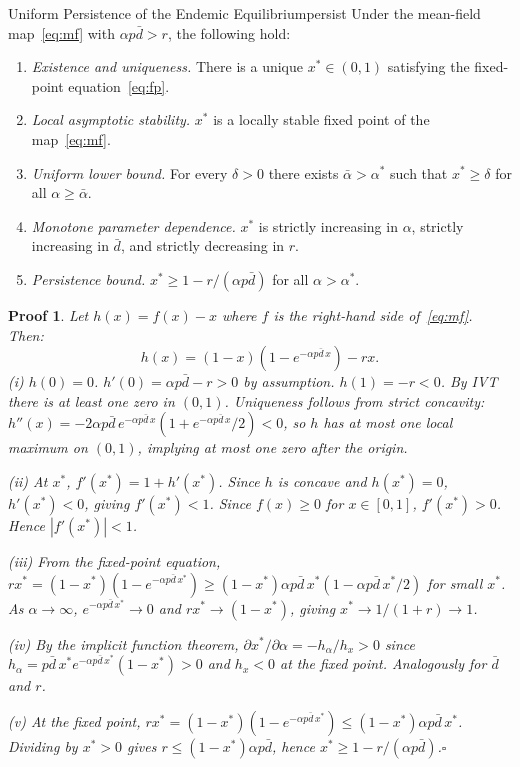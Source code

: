 \documentclass[10pt,twocolumn]{article}
\theoremstyle{myproof}
\newtheorem*{proof*}{Proof}
\newcommand{\xst}{x^*}
\begin{document}
\begin{theorem}{Uniform Persistence of the Endemic Equilibrium}{persist}
Under the mean-field map~\eqref{eq:mf} with $\alpha p\bar{d}>r$, the following hold:
\begin{enumerate}
  \item[\normalfont(i)] \emph{Existence and uniqueness.} There is a unique $\xst\in(0,1)$
       satisfying the fixed-point equation~\eqref{eq:fp}.
  \item[\normalfont(ii)] \emph{Local asymptotic stability.} $\xst$ is a locally stable fixed
       point of the map~\eqref{eq:mf}.
  \item[\normalfont(iii)] \emph{Uniform lower bound.} For every $\delta>0$ there exists
       $\bar\alpha>\alpha^*$ such that $\xst\geq\delta$ for all $\alpha\geq\bar\alpha$.
  \item[\normalfont(iv)] \emph{Monotone parameter dependence.} $\xst$ is strictly increasing
       in $\alpha$, strictly increasing in $\bar{d}$, and strictly decreasing in $r$.
  \item[\normalfont(v)] \emph{Persistence bound.} $\xst\geq 1-r/(\alpha p\bar{d})$ for all
       $\alpha>\alpha^*$.
\end{enumerate}
\end{theorem}

\begin{proof*}
Let $h(x)=f(x)-x$ where $f$ is the right-hand side of~\eqref{eq:mf}. Then:
\[
  h(x)=(1-x)(1-e^{-\alpha p\bar{d}\,x})-rx.
\]
(i) $h(0)=0$. $h'(0)=\alpha p\bar{d}-r>0$ by assumption. $h(1)=-r<0$. By IVT there is at
least one zero in $(0,1)$. Uniqueness follows from strict concavity: $h''(x)=-2\alpha p\bar{d}\,e^{-\alpha p\bar{d}\,x}(1+e^{-\alpha p\bar{d}\,x}/2)<0$, so $h$ has at most one local maximum on $(0,1)$, implying at most one zero after the origin.

(ii) At $\xst$, $f'(\xst)=1+h'(\xst)$. Since $h$ is concave and $h(\xst)=0$, $h'(\xst)<0$,
giving $f'(\xst)<1$. Since $f(x)\geq 0$ for $x\in[0,1]$, $f'(\xst)>0$. Hence $|f'(\xst)|<1$.

(iii) From the fixed-point equation, $r\xst=(1-\xst)(1-e^{-\alpha p\bar{d}\,\xst})\geq
(1-\xst)\alpha p\bar{d}\,\xst(1-\alpha p\bar{d}\,\xst/2)$ for small $\xst$. As $\alpha\to\infty$,
$e^{-\alpha p\bar{d}\,\xst}\to 0$ and $r\xst\to(1-\xst)$, giving $\xst\to 1/(1+r)\to 1$.

(iv) By the implicit function theorem, $\partial\xst/\partial\alpha=-h_\alpha/h_x>0$ since $h_\alpha=p\bar{d}\,\xst e^{-\alpha p\bar{d}\,\xst}(1-\xst)>0$ and $h_x<0$ at the fixed point.
Analogously for $\bar{d}$ and $r$.

(v) At the fixed point, $r\xst=(1-\xst)(1-e^{-\alpha p\bar{d}\,\xst})\leq(1-\xst)\alpha p\bar{d}\,\xst$.
Dividing by $\xst>0$ gives $r\leq(1-\xst)\alpha p\bar{d}$, hence $\xst\geq 1-r/(\alpha p\bar{d})$.\hfill$\square$
\end{proof*}
\end{document}
